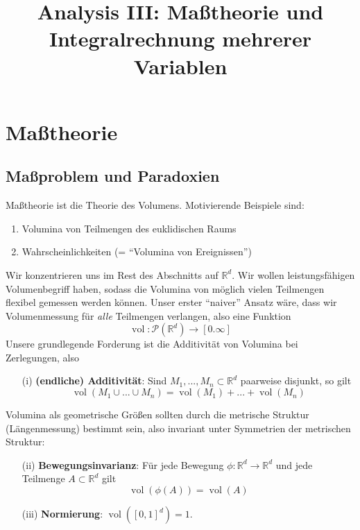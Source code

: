 \documentclass[12pt,a4paper]{article}
\title{Analysis III: Maßtheorie und Integralrechnung mehrerer Variablen}
\theoremstyle{definition}
\theoremstyle{remark}
\newcommand{\R}{\mathbb{R}}
\newcommand{\vol}{\operatorname{vol}}
\begin{document}
\maketitle
\tableofcontents
{}
\newpage
\section{Maßtheorie}
\subsection{Maßproblem und Paradoxien}
Maßtheorie ist die Theorie des Volumens. Motivierende Beispiele sind:
\begin{enumerate}[label=\roman*),topsep=3pt, itemsep=0pt]
\item Volumina von Teilmengen des euklidischen Raums
\item Wahrscheinlichkeiten (= ``Volumina von Ereignissen'')
\end{enumerate}
Wir konzentrieren uns im Rest des Abschnitts auf $\R^d$. Wir wollen leistungsfähigen Volumenbegriff haben, sodass die Volumina von möglich vielen Teilmengen flexibel gemessen werden können. Unser erster ``naiver'' Ansatz wäre, dass wir Volumenmessung für \emph{alle} Teilmengen verlangen, also eine Funktion
\begin{equation}
 \vol: \mathcal{P}(\R^d) \longrightarrow [0.\infty]
\end{equation}
Unsere grundlegende Forderung ist die Additivität von Volumina bei Zerlegungen, also
\begin{enumerate}
\item[(i)] \textbf{(endliche) Additivität}: Sind $M_1,...,M_n\subset \R^d$ paarweise disjunkt, so gilt
\begin{equation}
\vol (M_1\cup ... \cup M_n) = \vol(M_1)+...+\vol (M_n)
\end{equation}
\end{enumerate}
Volumina als geometrische Größen sollten durch die metrische Struktur (Längenmessung) bestimmt sein, also invariant unter Symmetrien der metrischen Struktur:
\begin{enumerate}
\item[(ii)] \textbf{Bewegungsinvarianz}: Für jede Bewegung $\phi: \R^d \longrightarrow \R^d$ und jede Teilmenge $A\subset \R^d$ gilt
\begin{equation}
\vol(\phi(A)) = \vol (A)
\end{equation}
\item[(iii)] \textbf{Normierung}: $\vol([0,1]^d)=1$.
\end{enumerate}
\end{document}
